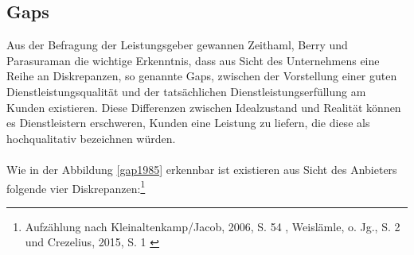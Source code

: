 \subsection{Gaps}
Aus der Befragung der Leistungsgeber gewannen Zeithaml, Berry und Parasuraman die wichtige Erkenntnis, dass aus Sicht des Unternehmens eine Reihe an Diskrepanzen, so genannte \glqq Gaps\grqq, zwischen der Vorstellung einer guten Dienstleistungsqualität und der tatsächlichen Dienstleistungserfüllung am Kunden existieren. Diese Differenzen zwischen Idealzustand und Realität können es Dienstleistern erschweren, Kunden eine Leistung zu liefern, die diese als hochqualitativ bezeichnen würden.
\\ \\
Wie in der Abbildung \ref{gap1985} erkennbar ist existieren aus Sicht des Anbieters folgende vier Diskrepanzen:\footnote{Aufzählung nach Kleinaltenkamp/Jacob, 2006, S. 54 \cite{Kleinaltenkamp2006}, Weislämle, o. Jg., S. 2 \cite{Weislaemle} und Crezelius, 2015, S. 1 \cite{Crezelius2015}}
